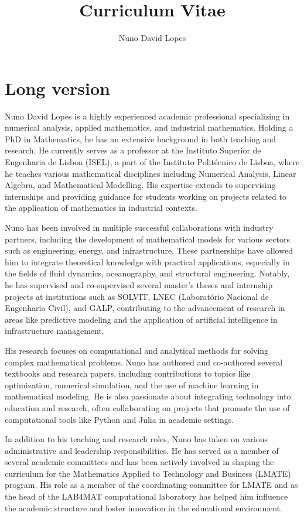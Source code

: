 \documentclass[a4paper,11pt]{article}
\title{Curriculum Vitae}
\author{Nuno David Lopes}
\date{}
\begin{document}
\maketitle
\section{Long version}
Nuno David Lopes is a highly experienced academic professional specializing in numerical analysis, applied mathematics, and industrial mathematics. Holding a PhD in Mathematics, he has an extensive background in both teaching and research. He currently serves as a professor at the Instituto Superior de Engenharia de Lisboa (ISEL), a part of the Instituto Politécnico de Lisboa, where he teaches various mathematical disciplines including Numerical Analysis, Linear Algebra, and Mathematical Modelling. His expertise extends to supervising internships and providing guidance for students working on projects related to the application of mathematics in industrial contexts.

Nuno has been involved in multiple successful collaborations with industry partners, including the development of mathematical models for various sectors such as engineering, energy, and infrastructure. These partnerships have allowed him to integrate theoretical knowledge with practical applications, especially in the fields of fluid dynamics, oceanography, and structural engineering. Notably, he has supervised and co-supervised several master’s theses and internship projects at institutions such as SOLVIT, LNEC (Laboratório Nacional de Engenharia Civil), and GALP, contributing to the advancement of research in areas like predictive modeling and the application of artificial intelligence in infrastructure management.

His research focuses on computational and analytical methods for solving complex mathematical problems. Nuno has authored and co-authored several textbooks and research papers, including contributions to topics like optimization, numerical simulation, and the use of machine learning in mathematical modeling. He is also passionate about integrating technology into education and research, often collaborating on projects that promote the use of computational tools like Python and Julia in academic settings.

In addition to his teaching and research roles, Nuno has taken on various administrative and leadership responsibilities. He has served as a member of several academic committees and has been actively involved in shaping the curriculum for the Mathematics Applied to Technology and Business (LMATE) program. His role as a member of the coordinating committee for LMATE and as the head of the LAB4MAT computational laboratory has helped him influence the academic structure and foster innovation in the educational environment. 
\end{document}
